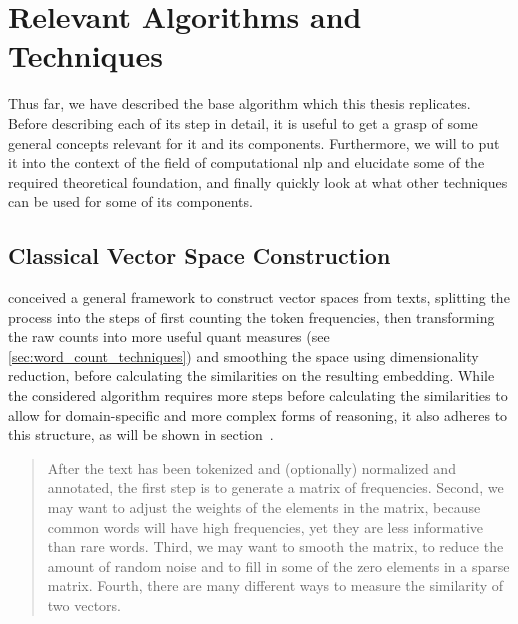 \section{Relevant Algorithms and Techniques}
\label{sec:required_algos}


Thus far, we have described the base algorithm which this thesis replicates. Before describing each of its step in detail, it is useful to get a grasp of some general concepts relevant for it and its components. Furthermore, we will to put it into the context of the field of computational \gls{nlp} and elucidate some of the required theoretical foundation, and finally quickly look at what other techniques can be used for some of its components. 

\subsection{Classical Vector Space Construction}
\label{sec:vsm_construction}


\textcite{Lowe} conceived a general framework to construct vector spaces from texts, splitting the process into the steps of first counting the token frequencies, then transforming the raw counts into more useful \gls{quant} measures (see \ref{sec:word_count_techniques}) %
and smoothing the space using dimensionality reduction, before calculating the similarities on the resulting embedding. While the considered algorithm requires more steps before calculating the similarities to allow for domain-specific and more complex forms of reasoning, it also adheres to this structure, as will be shown in section~.

\begin{quote}
	After the text has been tokenized and (optionally) normalized and annotated, the first step is to generate a matrix of frequencies. Second, we may want to adjust the weights of the elements in the matrix, because common words will have high frequencies, yet they are less informative than rare words. Third, we may want to smooth the matrix, to reduce the amount of random noise and to fill in some of the zero elements in a sparse matrix. Fourth, there are many different ways to measure the similarity of two vectors. \hfill \textcite{Turney2010}
\end{quote}


